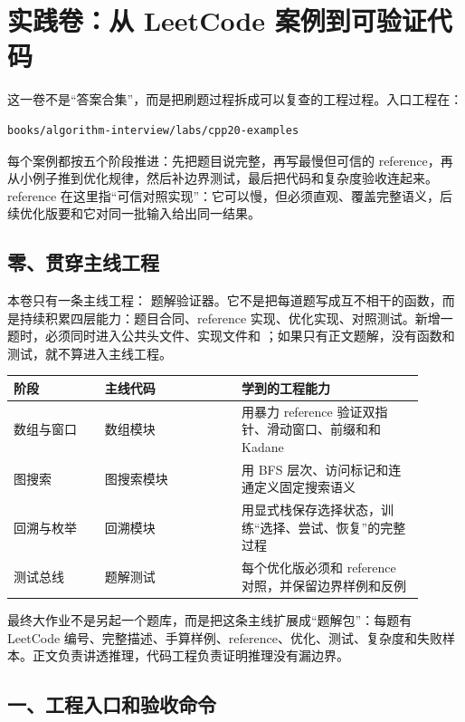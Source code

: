 \chapter{实践卷：从 LeetCode 案例到可验证代码}

这一卷不是“答案合集”，而是把刷题过程拆成可以复查的工程过程。入口工程在：

\begin{lstlisting}[language=bash]
books/algorithm-interview/labs/cpp20-examples
\end{lstlisting}

每个案例都按五个阶段推进：先把题目说完整，再写最慢但可信的 reference，再从小例子推到优化规律，然后补边界测试，最后把代码和复杂度验收连起来。reference 在这里指“可信对照实现”：它可以慢，但必须直观、覆盖完整语义，后续优化版要和它对同一批输入给出同一结果。

\section{零、贯穿主线工程}

本卷只有一条主线工程： 题解验证器。它不是把每道题写成互不相干的函数，而是持续积累四层能力：题目合同、reference 实现、优化实现、对照测试。新增一题时，必须同时进入公共头文件、实现文件和 ；如果只有正文题解，没有函数和测试，就不算进入主线工程。

\begin{longtable}{p{0.20\linewidth}p{0.30\linewidth}p{0.40\linewidth}}
阶段 & 主线代码 & 学到的工程能力 \\
\hline
数组与窗口 & 数组模块 & 用暴力 reference 验证双指针、滑动窗口、前缀和和 Kadane \\
图搜索 & 图搜索模块 & 用 BFS 层次、访问标记和连通定义固定搜索语义 \\
回溯与枚举 & 回溯模块 & 用显式栈保存选择状态，训练“选择、尝试、恢复”的完整过程 \\
测试总线 & 题解测试 & 每个优化版必须和 reference 对照，并保留边界样例和反例 \\
\end{longtable}

最终大作业不是另起一个题库，而是把这条主线扩展成“题解包”：每题有 LeetCode 编号、完整描述、手算样例、reference、优化、测试、复杂度和失败样本。正文负责讲透推理，代码工程负责证明推理没有漏边界。

\section{一、工程入口和验收命令}

